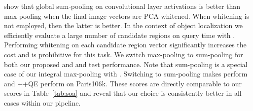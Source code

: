 \cite{BL15} show that global sum-pooling on convolutional layer activations is better than max-pooling when the final image vectors are PCA-whitened. 
When whitening is not employed, then the latter is better.
In the context of object localization we efficiently evaluate a large number of candidate regions on query time with \deeploc.
Performing whitening on each candidate region vector significantly increases the cost and is prohibitive for this task.
We switch max-pooling to sum-pooling for both our proposed \rfv and \deeploc and test performance. Note that sum-pooling is a special case of our integral max-pooling with .
Switching to sum-pooling makes \rfv perform  and \rfv+\deeploc+QE perform  on Paris106k. These scores are directly comparable to our scores in Table~\ref{tab:soa} and reveal that our choice is consistently better in all cases within our pipeline.
